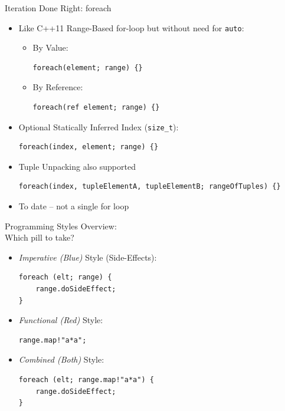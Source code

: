 \documentclass[xcolor=dvipsnames]{beamer}
\begin{document}
\begin{frame}[fragile]{Iteration Done Right: foreach}
  \begin{itemize}[<+->]
  \item Like C++11 Range-Based for-loop but without need for \texttt{auto}:
    \begin{itemize}[<+->]

    \item By Value:\\
      \begin{lstlisting}[frame=single]
foreach(element; range) {}
      \end{lstlisting}

    \item By Reference:\\
      \begin{lstlisting}[frame=single]
foreach(ref element; range) {}
      \end{lstlisting}
    \end{itemize}

  \item Optional Statically Inferred Index (\texttt{size\_t}):\\
      \begin{lstlisting}[frame=single]
foreach(index, element; range) {}
      \end{lstlisting}

  \item Tuple Unpacking also supported
      \begin{lstlisting}[frame=single]
foreach(index, tupleElementA, tupleElementB; rangeOfTuples) {}
      \end{lstlisting}

  \item To date – not a single for loop
  \end{itemize}
\end{frame}

\begin{frame}[fragile]{Programming Styles Overview:\\Which pill to take?}
  \begin{itemize}[<+->]
  \item \emph{Imperative (Blue)} Style (Side-Effects):\\
    \begin{lstlisting}[frame=single]
foreach (elt; range) {
    range.doSideEffect;
}
    \end{lstlisting}
  \item \emph{Functional (Red)} Style:\\
    \begin{lstlisting}[frame=single]
range.map!"a*a";
    \end{lstlisting}
  \item \emph{Combined (Both)} Style:\\
  \begin{lstlisting}[frame=single]
foreach (elt; range.map!"a*a") {
    range.doSideEffect;
}
  \end{lstlisting}
  \end{itemize}
\end{frame}
\end{document}

